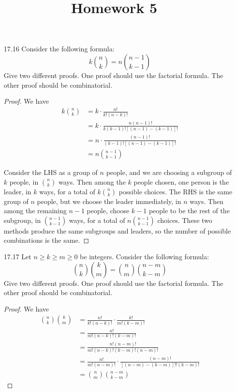 \documentclass{article}
\begin{document}
\title{Homework 5}
\maketitle
\thispagestyle{fancy}

\begin{itemize}
	\item[17.16] Consider the following formula:
		\[k\binom{n}{k}=n\binom{n-1}{k-1}\]
		Give two different proofs. One proof should use the factorial formula. The other proof should be combinatorial.
		\begin{proof}
			We have
			\begin{align*}
				k\binom{n}{k} &= k\cdot \frac{n!}{k!(n-k)!} \\
				&= k\cdot\frac{n(n-1)!}{k(k-1)!\left[ (n-1)-(k-1) \right]!} \\
				&= n\cdot \frac{(n-1)!}{(k-1)!\left[ (n-1)-(k-1) \right]!} \\
				&= n\binom{n-1}{k-1}
			\end{align*}

			Consider the LHS as a group of $n$ people, and we are choosing a subgroup of $k$ people, in $\binom{n}{k}$ ways. Then among the $k$ people chosen, one person is the leader, in $k$ ways, for a total of $k\binom{n}{k}$ possible choices. The RHS is the same group of $n$ people, but we choose the leader immediately, in $n$ ways. Then among the remaining $n-1$ people, choose $k-1$ people to be the rest of the subgroup, in $\binom{n-1}{k-1}$ ways, for a total of $n\binom{n-1}{k-1}$ choices. These two methods produce the same subgroups and leaders, so the number of possible combinations is the same.
		\end{proof}

	\item[17.17] Let $n\ge k\ge m\ge 0$ be integers. Consider the following formula:
		\[\binom{n}{k}\binom{k}{m}=\binom{n}{m}\binom{n-m}{k-m}\]
		Give two different proofs. One proof should use the factorial formula. The other proof should be combinatorial.
		\begin{proof}
			We have
			\begin{align*}
				\binom{n}{k}\binom{k}{m} &= \frac{n!}{k!(n-k)!}\cdot \frac{k!}{m!(k-m)!} \\
				&= \frac{n!}{m!(n-k)!(k-m)!} \\
				&= \frac{n!(n-m)!}{m!(n-k)!(k-m)!(n-m)!} \\
				&= \frac{n!}{m!(n-m)!}\cdot \frac{(n-m)!}{\left[ (n-m)-(k-m) \right]!!(k-m)!} \\
				&= \binom{n}{m}\binom{n-m}{k-m}
			\end{align*}


\end{proof}
\end{itemize}
\end{document}

